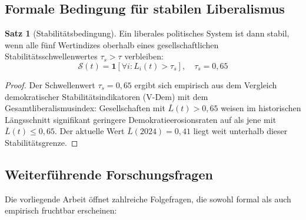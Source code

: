 ﻿\documentclass[a4paper,12pt]{article}
\theoremstyle{definition}
\newtheorem{satz}{Satz}
\begin{document}
\subsection{Formale Bedingung für stabilen Liberalismus}

\begin{satz}[Stabilitätsbedingung]
Ein liberales politisches System ist dann stabil, wenn alle fünf Wertindizes oberhalb eines gesellschaftlichen Stabilitätsschwellenwertes $\tau_s > \tau$ verbleiben:
\[
\mathcal{S}(t) = \mathbf{1}\!\left[\forall i: L_i(t) > \tau_s\right], \quad \tau_s = 0{,}65
\]
\end{satz}

\begin{proof}
Der Schwellenwert $\tau_s = 0{,}65$ ergibt sich empirisch aus dem Vergleich demokratischer Stabilitätsindikatoren (V-Dem) mit dem Gesamtliberalismusindex: Gesellschaften mit $\bar{L}(t) > 0{,}65$ weisen im historischen Längsschnitt signifikant geringere Demokratieerosionsraten auf als jene mit $\bar{L}(t) \leq 0{,}65$. Der aktuelle Wert $\bar{L}(2024) = 0{,}41$ liegt weit unterhalb dieser Stabilitätsgrenze. \qedhere
\end{proof}

\subsection{Weiterführende Forschungsfragen}

Die vorliegende Arbeit öffnet zahlreiche Folgefragen, die sowohl formal als auch empirisch fruchtbar erscheinen:
\end{document}
